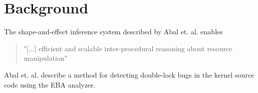 \section{Background}

The shape-and-effect inference system described by Abal et. al. \cite{Abal2017EffectiveBF} enables \begin{quote}
    "[...] efficient and scalable inter-procedural reasoning about resource manipulation"
\end{quote}
 
Abal et. al. describe a method for detecting double-lock bugs in the kernel source code using the EBA analyzer. 